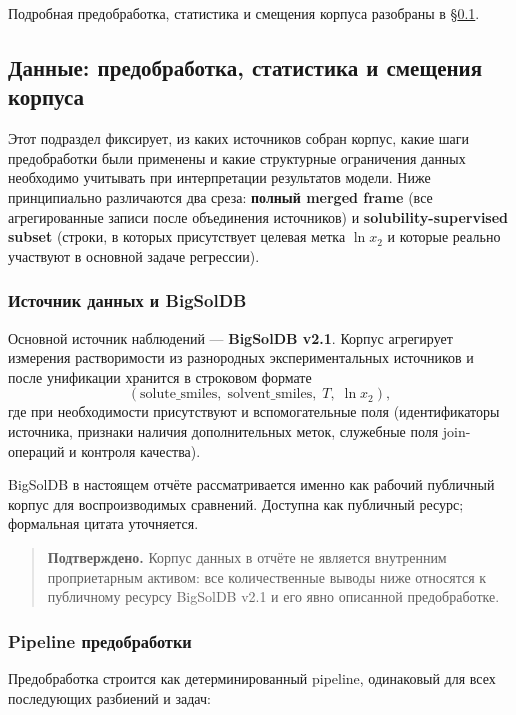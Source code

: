\documentclass[11pt]{article}
\newcommand{\validated}[1]{\begin{quote}\textbf{Подтверждено.} #1\end{quote}}
\begin{document}
Подробная предобработка, статистика и смещения корпуса разобраны в §\ref{subsec:data-preprocessing}.

\subsection{Данные: предобработка, статистика и смещения корпуса}
\label{subsec:data-preprocessing}

Этот подраздел фиксирует, из каких источников собран корпус, какие шаги предобработки были применены и какие структурные ограничения данных необходимо учитывать при интерпретации результатов модели. Ниже принципиально различаются два среза: \textbf{полный merged frame} (все агрегированные записи после объединения источников) и \textbf{solubility-supervised subset} (строки, в которых присутствует целевая метка $\ln x_2$ и которые реально участвуют в основной задаче регрессии).

\subsubsection{Источник данных и BigSolDB}

Основной источник наблюдений --- \textbf{BigSolDB v2.1}. Корпус агрегирует измерения растворимости из разнородных экспериментальных источников и после унификации хранится в строковом формате
\begin{equation*}
(\mathrm{solute\_smiles},\; \mathrm{solvent\_smiles},\; T,\; \ln x_2),
\end{equation*}
где при необходимости присутствуют и вспомогательные поля (идентификаторы источника, признаки наличия дополнительных меток, служебные поля join-операций и контроля качества).

BigSolDB в настоящем отчёте рассматривается именно как рабочий публичный корпус для воспроизводимых сравнений. Доступна как публичный ресурс; формальная цитата уточняется.

\validated{Корпус данных в отчёте не является внутренним проприетарным активом: все количественные выводы ниже относятся к публичному ресурсу BigSolDB v2.1 и его явно описанной предобработке.}

\subsubsection{Pipeline предобработки}

Предобработка строится как детерминированный pipeline, одинаковый для всех последующих разбиений и задач:
\end{document}
